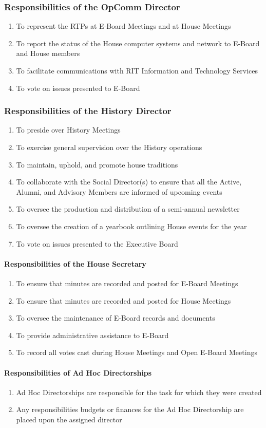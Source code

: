 \documentclass{article}
\newcommand{\asubsection}[1]{\subsubsection{#1} \label{#1}}
\newcommand{\asubsubsection}[1]{\paragraph{#1} \label{#1}}
\begin{document}
\asubsection{Responsibilities of the OpComm Director}
\begin{enumerate}
	\item To represent the RTPs at E-Board Meetings and at House Meetings
	\item To report the status of the House computer systems and network to E-Board and House members
	\item To facilitate communications with RIT Information and Technology Services
	\item To vote on issues presented to E-Board
\end{enumerate}

\asubsection{Responsibilities of the History Director}
\begin{enumerate}
	\item To preside over History Meetings
	\item To exercise general supervision over the History operations
	\item To maintain, uphold, and promote house traditions
	\item To collaborate with the Social Director(s) to ensure that all the Active, Alumni, and Advisory Members are informed of upcoming events
	\item To oversee the production and distribution of a semi-annual newsletter
	\item To oversee the creation of a yearbook outlining House events for the year
	\item To vote on issues presented to the Executive Board
\end{enumerate}

\asubsubsection{Responsibilities of the House Secretary}
\begin{enumerate}
	\item To ensure that minutes are recorded and posted for E-Board Meetings
	\item To ensure that minutes are recorded and posted for House Meetings
	\item To oversee the maintenance of E-Board records and documents
	\item To provide administrative assistance to E-Board
	\item To record all votes cast during House Meetings and Open E-Board Meetings
\end{enumerate}

\asubsubsection{Responsibilities of Ad Hoc Directorships}
\begin{enumerate}
	\item Ad Hoc Directorships are responsible for the task for which they were created
	\item Any responsibilities budgets or finances for the Ad Hoc Directorship are placed upon the assigned director
\end{enumerate}
\end{document}
